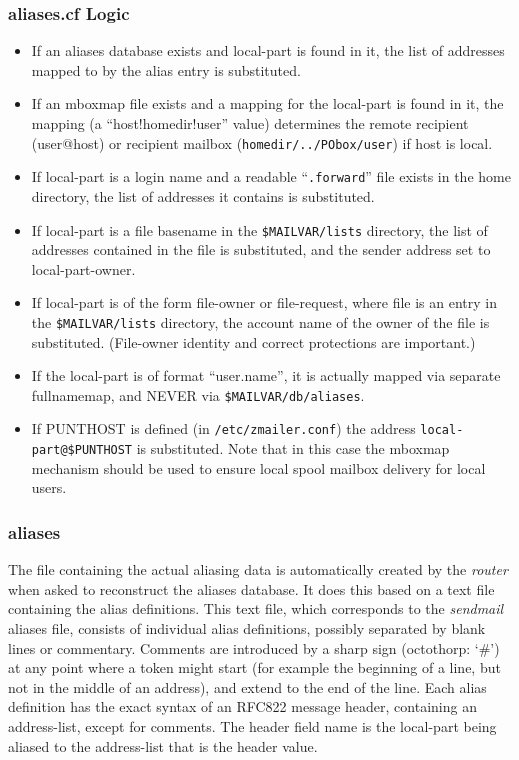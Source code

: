 \subsubsection{aliases.cf Logic}

\begin{itemize}
\item
If an aliases database exists and local-part is found in it, the list of
addresses mapped to by the alias entry is substituted.
\item
If an mboxmap file exists and a mapping for the local-part is found in it,
the mapping (a ``host!homedir!user'' value) determines the remote recipient
(user@host) or recipient mailbox ({\tt homedir/../PObox/user}) if host 
is local.
\item
If local-part is a login name and a readable ``{\tt .forward}'' file 
exists in the home directory, the list of addresses it contains is
substituted.
\item
If local-part is a file basename in the {\tt \$MAILVAR/lists} 
directory, the   list of addresses contained in the file is
substituted, and the sender address set to local-part-owner.
\item
If local-part is of the form file-owner or file-request, where file is
an entry in the {\tt \$MAILVAR/lists} directory, the account name 
of the owner of the file is substituted.   (File-owner identity and correct 
protections are important.)
\item
If the local-part is of format  ``user.name'',  it is actually mapped via
separate   fullnamemap, and NEVER via {\tt \$MAILVAR/db/aliases}.
\item
If PUNTHOST is defined (in {\tt /etc/zmailer.conf}) the address
{\tt local-part@\$PUNTHOST} is substituted.  Note that in this case
the mboxmap mechanism should be used to ensure local spool
mailbox delivery for local users.
\end{itemize}


\subsubsection{aliases}

The file containing the actual aliasing data is automatically created by
the {\em router} when asked to reconstruct the aliases database.  It does this
based on a text file containing the alias definitions.  This text file,
which corresponds to the {\em sendmail} aliases file, consists of individual
alias definitions, possibly separated by blank lines or commentary.
Comments are introduced by a sharp sign (octothorp: `\#') at any point where
a token might start (for example the beginning of a line, but not in the
middle of an address), and extend to the end of the line.  Each alias
definition has the exact syntax of an RFC822 message header, containing an
address-list, except for comments.  The header field name is the local-part
being aliased to the address-list that is the header value.

